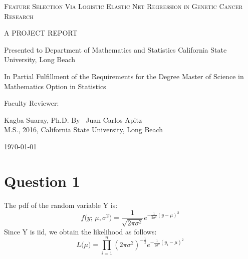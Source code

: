 \documentclass[12pt,a4paper]{report}
\begin{document}
\begin{titlepage}
	\centering
	{\scshape\Large Feature Selection Via Logistic Elastic Net Regression in Genetic Cancer Research \par}
	\vspace{1cm}
	{\scshape\large A PROJECT REPORT\par}
	{\large Presented to Department of Mathematics and Statistics California State University, Long Beach\par}
	\vspace{4cm}
	{\large In Partial Fulfillment of the Requirements for the Degree Master of Science in Mathematics Option in Statistics\par}
	\vspace{3cm}
	{\large Faculty Reviewer:\par}
	\vspace{0.5cm}
	{\large Kagba Suaray, Ph.D.}
	\vfill
	\large By ~Juan Carlos Apitz\\
	\large M.S., 2016, California State University, Long Beach\par

	\vfill

	{\large \today\par}
\end{titlepage}





%

\newcommand{\normalpdf}[1]{f \big( #1 \text{; } \mu,\sigma^2 \big) = \frac{1}{\sqrt{2 \pi \sigma^2}} e^{-\frac{1}{2 \sigma^2}(#1-\mu)^2}}

\newcommand{\expectedvalue}[1]{E \left(#1\right)}

\section*{Question 1}
The pdf of the random variable Y is:
\[
\normalpdf{y}
\]
Since Y is iid, we obtain the likelihood as follows:
\[
L\big(\mu\big) = \prod_{i=1}^n \left(2 \pi \sigma^2\right)^{-\frac{1}{2}} e^{-\frac{1}{2 \sigma^2}(y_i-\mu)^2}
\]
\end{document}
